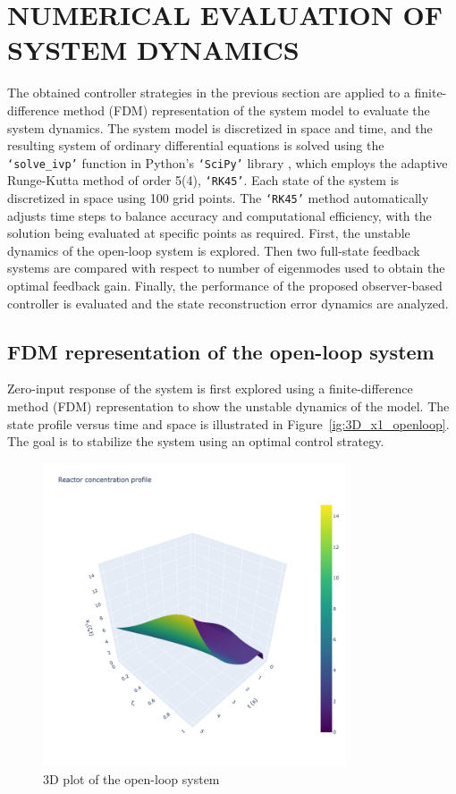 \section{NUMERICAL EVALUATION OF SYSTEM DYNAMICS}

The obtained controller strategies in the previous section are applied to a finite-difference method (FDM) representation of the system model to evaluate the system dynamics. The system model is discretized in space and time, and the resulting system of ordinary differential equations is solved using the \texttt{`solve\_ivp'} function in Python's \texttt{`SciPy'} library \autocite{2020SciPy}, which employs the adaptive Runge-Kutta method of order 5(4), \texttt{`RK45'}. Each state of the system is discretized in space using 100 grid points. The \texttt{`RK45'} method automatically adjusts time steps to balance accuracy and computational efficiency, with the solution being evaluated at specific points as required. First, the unstable dynamics of the open-loop system is explored. Then two full-state feedback systems are compared with respect to number of eigenmodes used to obtain the optimal feedback gain. Finally, the performance of the proposed observer-based controller is evaluated and the state reconstruction error dynamics are analyzed.

\subsection{FDM representation of the open-loop system}

Zero-input response of the system is first explored using a finite-difference method (FDM) representation to show the unstable dynamics of the model. The state profile versus time and space is illustrated in Figure~\ref{ig:3D_x1_openloop}. The goal is to stabilize the system using an optimal control strategy.

\begin{figure}[H]
    \centering
    \includegraphics[width=0.8\textwidth]{Figures/3D_x1_openloop.png}
    \caption{3D plot of the open-loop system}
    \label{fig:3D_x1_openloop}
\end{figure}

